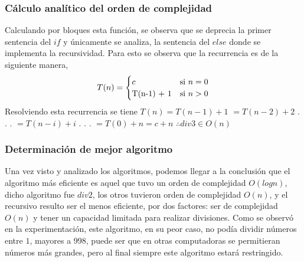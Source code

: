 \documentclass[12pt,twoside]{article}
\begin{document}
\subsubsection{Cálculo analítico del orden de complejidad}
Calculando por bloques esta función, se observa que se deprecia la primer sentencia del $if$ y únicamente se analiza, la sentencia del $else$ donde se implementa la recursividad.\newline
Para esto se observa que la recurrencia es de la siguiente manera,\newline
\begin{equation}
  T(n) =
    \begin{cases}
      c & \text{si $n = 0$}\\
      $T(n-1) + 1$ & \text{si $n > 0$}\\
    \end{cases}
\end{equation}
Resolviendo esta recurrencia se tiene\newline
$T(n) = T(n-1) + 1$\newline
    $ = T(n-2) + 2$\newline
    $.$\newline
    $.$\newline
    $.$\newline
    $ = T(n-i) + i$\newline
    $.$\newline
    $.$\newline
    $.$\newline
    $ = T(0) + n = c + n$\newline
$\therefore div3 \in O(n)$
\subsubsection{Determinación de mejor algoritmo}
Una vez visto y analizado los algoritmos, podemos llegar a la conclusión que el algoritmo más eficiente es aquel que tuvo un orden de complejidad $O(logn)$, dicho algoritmo fue $div2$, los otros tuvieron orden de complejidad $O(n)$, y el recursivo resulto ser el menos eficiente, por dos factores: ser de complejidad $O(n)$ y tener un capacidad limitada para realizar divisiones. Como se observó en la experimentación, este algoritmo, en su peor caso, no podía dividir números entre $1$, mayores a 998, puede ser que en otras computadoras se permitieran números más grandes, pero al final siempre este algoritmo estará restringido.
\end{document}
